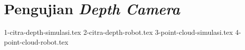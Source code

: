 \section{Pengujian \emph{Depth Camera}}
\label{sec:pengujiandepthcamera}

\textcolor{red}{\lipsum[1-2]}

{1-citra-depth-simulasi.tex}
{2-citra-depth-robot.tex}
{3-point-cloud-simulasi.tex}
{4-point-cloud-robot.tex}
